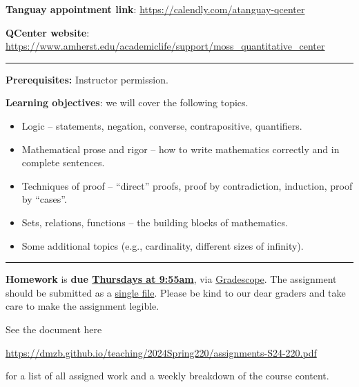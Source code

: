 \documentclass[12pt]{article}
\begin{document}
\noindent\textbf{Tanguay appointment link}: \url{https://calendly.com/atanguay-qcenter}
\medskip

\noindent\textbf{QCenter website}: \url{https://www.amherst.edu/academiclife/support/moss_quantitative_center}

\medskip \hrule \medskip

\noindent\textbf{Prerequisites:} Instructor permission.
\smallskip

\noindent \textbf{Learning objectives}: we will cover the following topics.

\begin{itemize}
\item Logic -- statements, negation, converse, contrapositive, quantifiers. \vspace{-5pt}
\item Mathematical prose and rigor -- how to write mathematics
 correctly and in complete sentences.\vspace{-5pt}
\item Techniques of proof -- ``direct'' proofs, proof by contradiction, induction, proof by ``cases''. \vspace{-5pt}
\item Sets, relations, functions -- the building blocks of mathematics. \vspace{-5pt}
\item Some additional topics (e.g., cardinality, different sizes of infinity).
\end{itemize}

\smallskip \hrule \medskip

\noindent \textbf{Homework} is \textbf{due \underline{Thursdays at 9:55am}}, via \underline{Gradescope}. The assignment should be submitted as a \underline{single file}. Please be kind to our dear graders and take care to make the assignment legible.
\smallskip

\noindent See the document here
\begin{center}
 \url{https://dmzb.github.io/teaching/2024Spring220/assignments-S24-220.pdf}
\end{center}
for a list of all assigned work and a weekly breakdown of the course content.
\medskip
\end{document}
